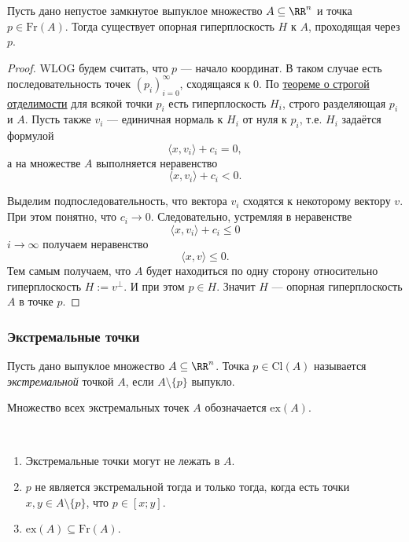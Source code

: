 \documentclass[12pt,a4paper]{article}
\newcommand{\Cl}{\ensuremath{\mathrm{Cl}}\xspace}
\newcommand{\Fr}{\ensuremath{\mathrm{Fr}}\xspace}
\newcommand{\ex}{\ensuremath{\mathrm{ex}}\xspace}
\begin{document}
    \begin{theorem}
        Пусть дано непустое замкнутое выпуклое множество $A \subseteq \RR^n$ и точка $p \in \Fr(A)$. Тогда существует опорная гиперплоскость $H$ к $A$, проходящая через $p$.
    \end{theorem}

    \begin{proof}
        WLOG будем считать, что $p$ --- начало координат. В таком случае есть последовательность точек $(p_i)_{i=0}^\infty$, сходящаяся к $0$. По \hyperref[strict-separability-theorem]{теореме о строгой отделимости} для всякой точки $p_i$ есть гиперплоскость $H_i$, строго разделяющая $p_i$ и $A$. Пусть также $v_i$ --- единичная нормаль к $H_i$ от нуля к $p_i$, т.е. $H_i$ задаётся формулой
        \[\langle x, v_i \rangle + c_i = 0,\]
        а на множестве $A$ выполняется неравенство
        \[\langle x, v_i \rangle + c_i < 0.\]

        Выделим подпоследовательность, что вектора $v_i$ сходятся к некоторому вектору $v$. При этом понятно, что $c_i \to 0$. Следовательно, устремляя в неравенстве
        \[\langle x, v_i \rangle + c_i \leqslant 0\]
        $i \to \infty$ получаем неравенство
        \[\langle x, v \rangle \leqslant 0.\]
        Тем самым получаем, что $A$ будет находиться по одну сторону относительно гиперплоскость $H := v^\perp$. И при этом $p \in H$. Значит $H$ --- опорная гиперплоскость $A$ в точке $p$.
    \end{proof}

    \subsubsection{Экстремальные точки}

    \begin{definition}
        Пусть дано выпуклое множество $A \subseteq \RR^n$. Точка $p \in \Cl(A)$ называется \emph{экстремальной} точкой $A$, если $A \setminus \{p\}$ выпукло.

        Множество всех экстремальных точек $A$ обозначается $\ex(A)$.
    \end{definition}

    \begin{lemma}\ 
        \begin{enumerate}
            \item Экстремальные точки могут не лежать в $A$.
            \item $p$ не является экстремальной тогда и только тогда, когда есть точки $x, y \in A \setminus \{p\}$, что $p \in [x; y]$.
            \item $\ex(A) \subseteq \Fr(A)$.
        \end{enumerate}
    \end{lemma}
\end{document}
